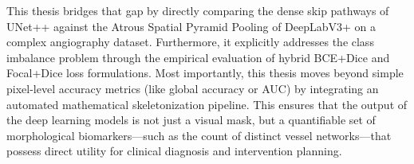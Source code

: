 This thesis bridges that gap by directly comparing the dense skip pathways of UNet++ against the Atrous Spatial Pyramid Pooling of DeepLabV3+ on a complex angiography dataset. Furthermore, it explicitly addresses the class imbalance problem through the empirical evaluation of hybrid BCE+Dice and Focal+Dice loss formulations. Most importantly, this thesis moves beyond simple pixel-level accuracy metrics (like global accuracy or AUC) by integrating an automated mathematical skeletonization pipeline. This ensures that the output of the deep learning models is not just a visual mask, but a quantifiable set of morphological biomarkers---such as the count of distinct vessel networks---that possess direct utility for clinical diagnosis and intervention planning.
